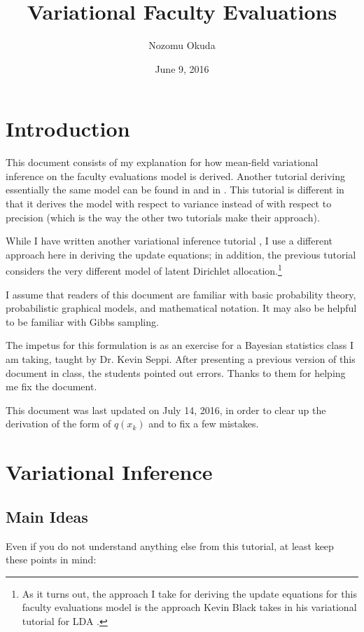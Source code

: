 \documentclass[12pt]{article}
\title{Variational Faculty Evaluations}
\author{Nozomu Okuda}
\date{June 9, 2016}
\begin{document}
\maketitle

\section{Introduction}

This document consists of my explanation for how mean-field variational
inference on the faculty evaluations model is derived.  Another tutorial
deriving essentially the same model can be found in \autocite{foxvartut} and in
\autocite{wikivar}.  This tutorial is different in that it derives the model
with respect to variance instead of with respect to precision (which is the way
the other two tutorials make their approach).

While I have written another variational inference tutorial \autocite{myvarlda},
I use a different approach here in deriving the update equations; in addition,
the previous tutorial considers the very different model of latent Dirichlet
allocation.\footnote{As it turns out, the approach I take for deriving the
update equations for this faculty evaluations model is the approach Kevin Black
takes in his variational tutorial for LDA \autocite{kb}.}

I assume that readers of this document are familiar with basic probability
theory, probabilistic graphical models, and mathematical notation.  It may also
be helpful to be familiar with Gibbs sampling.

The impetus for this formulation is as an exercise for a Bayesian statistics
class I am taking, taught by Dr. Kevin Seppi.  After presenting a previous
version of this document in class, the students pointed out errors.  Thanks to
them for helping me fix the document.

This document was last updated on July 14, 2016, in order to clear up the
derivation of the form of $q(x_k)$ and to fix a few mistakes.

\section{Variational Inference}

\subsection{Main Ideas}

Even if you do not understand anything else from this tutorial, at least keep
these points in mind:
\end{document}
